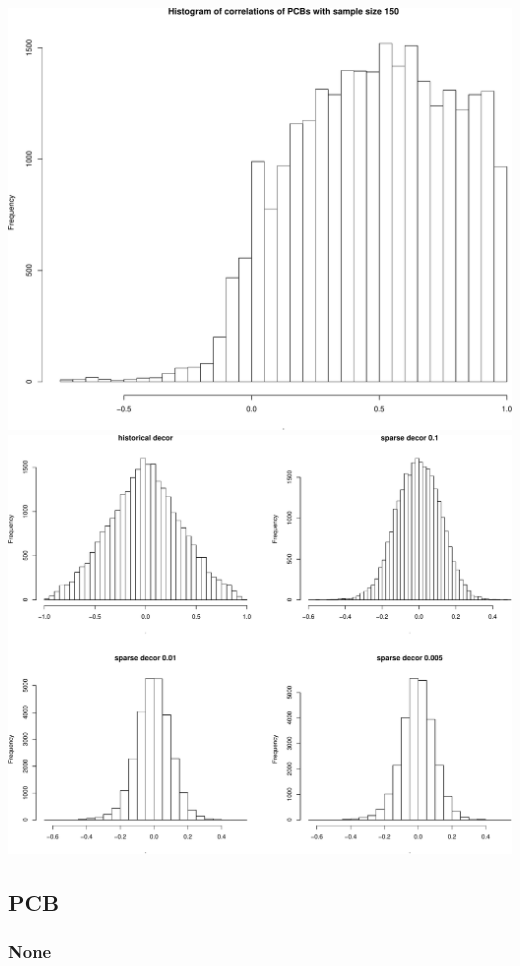 \documentclass[]{article}
\begin{document}
\includegraphics{Low_levels_covariance_sparse_decorr_files/figure-latex/unnamed-chunk-1-1.pdf}
\includegraphics{Low_levels_covariance_sparse_decorr_files/figure-latex/unnamed-chunk-1-2.pdf}

\newpage

\subsection{PCB}\label{pcb}

\subsubsection{None}\label{none}
\end{document}
